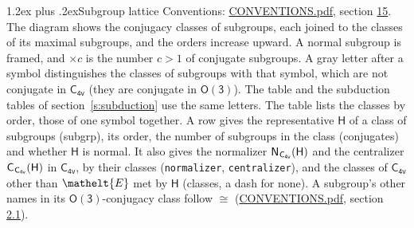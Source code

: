 \documentclass[10pt,a4paper]{article}
\makeatletter
\renewcommand\section{\@startsection{section}{1}{\z@}{-3ex plus -1ex minus -.2ex}%
  {1.2ex plus .2ex}{\normalfont\large\sffamily\bfseries\color{parttitle}}}
\numberwithin{equation}{section}
\newcommand{\eltfont}[1]{{\let\sigma\eltsigma\mathelt{#1}}}
\newcommand{\grp}[1]{\mathsf{#1}}
\newcommand{\cls}[1]{\eltfont{#1}}
\newcommand{\samecls}{\cong}
\newcommand{\nconj}[1]{{\scriptsize$\times#1$}}
\newcommand{\clsletter}[1]{\,{\scriptsize\color{black!55}#1}}
\newcommand{\hairsp}{\mkern1mu}
\makeatother
\begin{document}
\section{Subgroup lattice}\label{s:subgroups}
Conventions: \href{../../CONVENTIONS.pdf}{CONVENTIONS.pdf}, section \href{../../CONVENTIONS.pdf\#conv.15}{15}.
The diagram shows the conjugacy classes of subgroups, each joined to the classes of its maximal subgroups, and the orders increase upward. A normal subgroup is framed, and ${\times}c$ is the number $c > 1$ of conjugate subgroups. A gray letter after a symbol distinguishes the classes of subgroups with that symbol, which are not conjugate in $\grp{C_{4v}}$ (they are conjugate in \href{O3.pdf}{$\grp{O(3)}$}). The table and the subduction tables of section~\ref{s:subduction} use the same letters. The table lists the classes by order, those of one symbol together. \label{n:group.H}\label{n:head.subgroup}\label{n:head.order}\label{n:head.conjugates}\label{n:head.normal}A row gives the representative $\grp{H}$ of a class of subgroups (subgrp), its order, the number of subgroups in the class (conjugates) and whether $\grp{H}$ is normal. \label{n:group.normalizer}\label{n:group.centralizer}\label{n:head.classes}It also gives the normalizer $\grp{N}_{\hairsp \grp{C_{4v}}}(\grp{H})$ and the centralizer $\grp{C}_{\hairsp \grp{C_{4v}}}(\grp{H})$ in $\grp{C_{4v}}$, by their classes (\texttt{normalizer}, \texttt{centralizer}), and the classes of $\grp{C_{4v}}$ other than $\cls{E}$ met by $\grp{H}$ (classes, a dash for none). A subgroup's other names in its \href{O3.pdf}{$\grp{O(3)}$}-conjugacy class follow $\samecls$ (\href{../../CONVENTIONS.pdf}{CONVENTIONS.pdf}, section \href{../../CONVENTIONS.pdf\#conv.2.1}{2.1}).
\begin{center}
\end{center}
\end{document}
